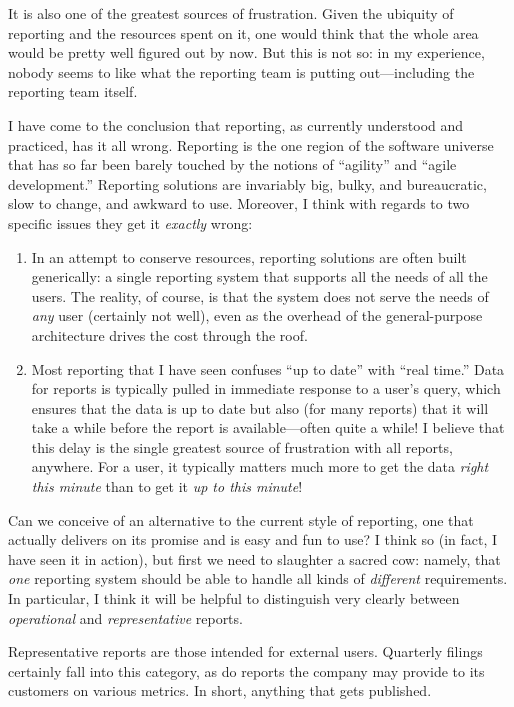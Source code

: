 It is also one of the greatest sources of frustration.  Given the
ubiquity of reporting and the resources spent on it, one would think
that the whole area would be pretty well figured out by now. But this
is not so: in my experience, nobody seems to like what the reporting
team is putting out---including the reporting team itself.

I have come to the conclusion that reporting, as currently understood
and practiced, has it all wrong. Reporting is the one region of the
software universe that has so far been barely touched by the notions
of ``agility'' and ``agile development.'' Reporting solutions are
invariably big, bulky, and bureaucratic, slow to change, and awkward to
use. Moreover, I think with regards to two specific issues they get it
\emph{exactly} wrong:

\begin{enumerate}
\item In an attempt to conserve resources, reporting solutions are
  often built generically: a single reporting system that supports all
  the needs of all the users. The reality, of course, is that the
  system does not serve the needs of \emph{any} user (certainly not
  well), even as the overhead of the general-purpose architecture
  drives the cost through the roof.

\item Most reporting that I have seen confuses ``up to date'' with
  ``real time.'' Data for reports is typically pulled in immediate
  response to a user's query, which ensures that the data is up to
  date but also (for many reports) that it will take a while before
  the report is available---often quite a while! I believe that this
  delay is the single greatest source of frustration with all reports,
  anywhere.  For a user, it typically matters much more to get the data
  \emph{right this minute} than to get it \emph{up to this minute}!
\end{enumerate}

Can we conceive of an alternative to the current style of reporting,
one that actually delivers on its promise and is easy and fun to use?
I think so (in fact, I have seen it in action), but first we need to
slaughter a sacred cow: namely, that \emph{one} reporting system
should be able to handle all kinds of \emph{different} requirements.
In particular, I think it will be helpful to distinguish very clearly
between \emph{operational} and \emph{representative} reports.

Representative reports are those intended for external users.
Quarterly filings certainly fall into this category, as do reports the
company may provide to its customers on various metrics.  In short,
anything that gets published.

